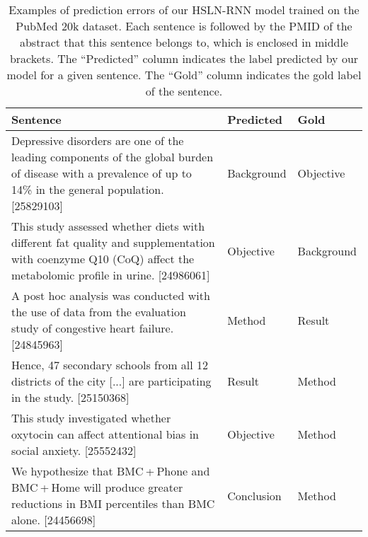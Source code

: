 \documentclass[11pt,a4paper]{article}
\begin{document}
\begin{table*}[t]
\centering
\begin{tabular}{ |>{\raggedright\arraybackslash} m{11.2cm} |>{\centering\arraybackslash} m{1.75cm} |>{\centering\arraybackslash} m{1.75cm}|}
\hline
\textbf{Sentence}                                     & \textbf{Predicted} & \textbf{Gold} \\ \hline

Depressive disorders are one of the leading components of the global burden of disease with a prevalence of up to 14\% in the general population. [25829103]                     & Background                  & Objective             \\ \hline
This study assessed whether diets with different fat quality and supplementation with coenzyme Q10 (CoQ) affect the metabolomic profile in urine. [24986061]                                                 & Objective                  & Background             \\ \hline
A post hoc analysis was conducted with the use of data from the evaluation study of congestive heart failure. [24845963]                                                                                                                         & Method                  & Result             \\ \hline
Hence, 47 secondary schools from all 12 districts of the city [...] are participating in the study. [25150368] & Result                  & Method             \\ \hline
This study investigated whether oxytocin can affect attentional bias in social anxiety. [25552432]                                                                                                                   & Objective                  & Method             \\ \hline
We hypothesize that BMC + Phone and BMC + Home will produce greater reductions in BMI percentiles than BMC alone. [24456698]                                                                                                                                                  & Conclusion                  & Method             \\ \hline
\end{tabular}
\caption{Examples of prediction errors of our HSLN-RNN model trained on the PubMed 20k dataset. Each sentence is followed by the PMID of the abstract that this sentence belongs to, which is enclosed in middle brackets. The ``Predicted'' column indicates the label predicted by our model for a given sentence. The ``Gold'' column indicates the gold label of the sentence.}
\label{table:error-analysis}
\end{table*}
\end{document}
